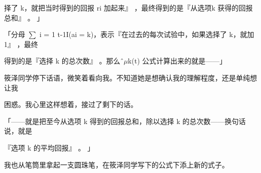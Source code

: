 择了 k，就把当时得到的回报 ri 加起来』 ，最终得到的是『从选项k 获得的回报总和』 。 」\par
「分母 $\sum$ i = 1 t-1I(ai = k)，表示『在过去的每次试验中，如果选择了 k，就加 1』 ，最终\par
得到的是『选择 k 的总次数』 。那么ˆ$\mu$k(t) 公式计算出来的就是——」\par
筱泽同学停下话语，微笑着看向我。不知道她是想确认我的理解程度，还是单纯想让我\par
困惑。我心里这样想着，接过了剩下的话。\par
「——就是把至今从选项 k 得到的回报总和，除以选择 k 的总次数——换句话说，就是\par
『选项 k 的平均回报』 。 」\par
我也从笔筒里拿起一支圆珠笔，在筱泽同学写下的公式下添上新的式子。\par

